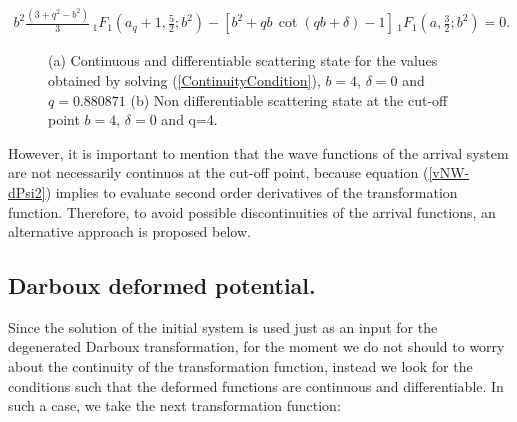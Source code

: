 \documentclass[a4paper]{jpconf}
\begin{document}
\begin{eqnarray}
b^{2}\frac{(3+q^{2}-b^{2})}{3}\, _1F_1\left(a_{q}+1,\frac{5}{2};b^{2}\right)-[b^{2}+qb\,\cot{(qb+\delta)}-1]\, _1F_1\left(a,\frac{3}{2};b^{2}\right)=0.\label{ContinuityCondition}
\end{eqnarray}

\begin{figure}
\centering
{}%
\hfill%
%
 \caption{\label{FigureX} (a) Continuous and differentiable scattering state for  the values obtained by solving (\ref{ContinuityCondition}), $b=4$, $\delta =0$ and $q=0.880871$ (b) Non differentiable scattering state at the cut-off point $b=4$,  $\delta =0$ and q=4.}
\end{figure}

However, it is important to mention that the wave functions of the arrival system are not necessarily continuos at the cut-off point, because equation (\ref{vNW-dPsi2}) implies to evaluate second order derivatives of the transformation function. Therefore, to avoid possible discontinuities of the arrival functions, an alternative approach is proposed below.\\

\subsection{Darboux deformed potential.}

Since the solution of the initial system is used just as an input for the degenerated Darboux transformation, for the moment we do not should to worry about the continuity of the transformation function, instead we look for the conditions such that the deformed functions are continuous and differentiable. In such a case, we take the next transformation function: 
\end{document}

